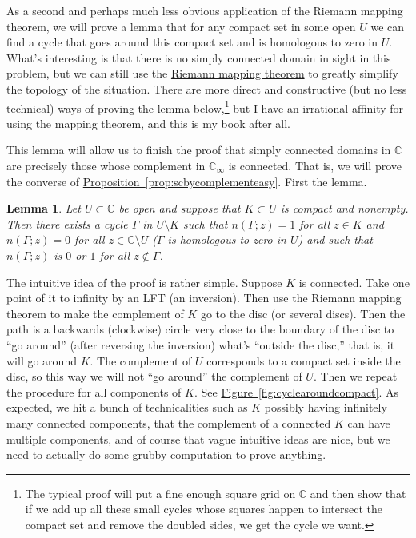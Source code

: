 \documentclass[12pt,openany]{book}
\newcommand{\C}{{\mathbb{C}}}
\newcommand{\myquote}[1]{``#1''}
\theoremstyle{plain}
\newtheorem{lemma}[thm]{Lemma}
\theoremstyle{remark}
\theoremstyle{definition}
\theoremstyle{exercise}
\theoremstyle{example}
\newcommand{\figureref}[1]{\hyperref[#1]{Figure~\ref*{#1}}}
\newcommand{\propref}[1]{\hyperref[#1]{Proposition~\ref*{#1}}}
\begin{document}
As a second and perhaps much less obvious application of the Riemann
mapping theorem,
we will prove a lemma that for any compact set in some open $U$
we can find a cycle that goes around this compact set and is homologous to
zero in $U$.
What's interesting is that there is no simply connected domain in sight
in this problem, but we can still use the
\hyperref[thm:RMT]{Riemann mapping theorem}
to greatly
simplify the topology of the situation.
There are more direct and
constructive (but no less technical) ways of proving the lemma below,\footnote{%
The typical proof will put a fine enough square grid on $\C$ and then
show that if we add up all these small cycles whose squares happen to intersect
the compact set and remove the doubled sides, we get the cycle we want.}
but I have an irrational affinity for using the mapping theorem, and this is
my book after all.

This lemma will allow us to finish the proof that simply
connected domains in $\C$ are precisely those 
whose complement in $\C_\infty$ is connected.  That is, we will prove
the converse of \propref{prop:scbycomplementeasy}.  First the lemma.

\begin{lemma}\label{lemma:patharoundK}
Let $U \subset \C$ be open and suppose that $K \subset U$ is compact and
nonempty.
Then there exists a cycle
$\Gamma$ in $U \setminus K$ such that $n(\Gamma;z) = 1$ for all $z \in K$ and
$n(\Gamma;z) = 0$ for all $z \in \C \setminus U$ ($\Gamma$ is homologous to
zero in $U$) and such that $n(\Gamma;z)$ is $0$ or $1$ for all $z \notin
\Gamma$.
\end{lemma}

The intuitive idea of the proof is rather simple.  Suppose $K$ is
connected.
Take one point of it to infinity by an LFT
(an inversion).
Then use the Riemann mapping theorem to make the complement of $K$ go to
the disc (or several discs).
Then the path is a backwards (clockwise) circle very close to the boundary of the disc
to \myquote{go around} (after reversing the inversion) what's
\myquote{outside the disc,} that is, it will go around $K$.
The complement of $U$
corresponds to a compact set inside the disc, so this way we will not
\myquote{go around} the complement of $U$.
Then we repeat the procedure for all components of $K$.  See
\figureref{fig:cyclearoundcompact}.  As expected,
we hit a bunch of technicalities such as $K$ possibly having
infinitely many connected components, that the complement of a connected
$K$ can have multiple components, and of course that vague intuitive ideas are
nice, but we need to actually do some grubby computation to prove anything.
\end{document}
